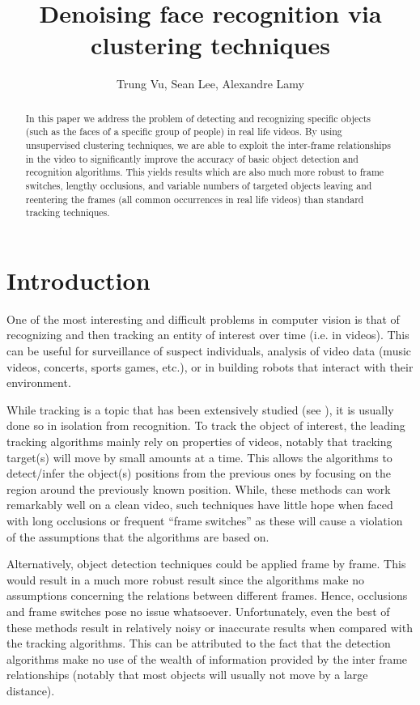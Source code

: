 \documentclass{article}
\title{Denoising face recognition via clustering techniques}
\author{Trung Vu, Sean Lee, Alexandre Lamy%
}
\begin{document}

\maketitle

\begin{abstract}
  In this paper we address the problem of detecting and recognizing specific objects (such as the faces of a specific group of people)
  in real life videos. By using unsupervised clustering techniques, we are able to exploit the inter-frame relationships in the
  video to significantly improve the accuracy of basic object detection and recognition algorithms. This yields results which are
  also much more robust to frame switches, lengthy occlusions, and variable numbers of targeted objects leaving and reentering the frames
  (all common occurrences in real life videos) than standard tracking techniques.
\end{abstract}

\section{Introduction}



One of the most interesting and difficult problems in computer vision is that of recognizing and then tracking an
entity of interest over time (i.e. in videos). This can be useful for surveillance of suspect individuals,
analysis of video data (music videos, concerts, sports games, etc.), or in building robots that interact with their
environment.

While tracking is a topic that has been extensively studied (see \cite{benchmarksurvey}), it is usually
done so in isolation from recognition. To track the object of interest, the leading tracking algorithms mainly rely on
properties of videos, notably that tracking target(s)
will move by small amounts at a time. This allows the algorithms to detect/infer the object(s) positions from the previous ones by
focusing on the region around the previously known position. While, these methods can work remarkably well on a clean video, such techniques have
little hope when faced with long occlusions or frequent ``frame switches'' as these will cause a violation of the assumptions that the algorithms are based on.

Alternatively, object detection techniques could be applied frame by frame. This would result in a much more robust result since the algorithms
make no assumptions concerning the relations between different frames. Hence, occlusions and frame switches pose no issue whatsoever. Unfortunately, even
the best of these methods result in relatively noisy or inaccurate results when compared with the tracking algorithms. This can be attributed to the fact that the detection
algorithms make no use of the wealth of information provided by the inter frame relationships (notably that most objects will usually not move by a large distance).
\end{document}
